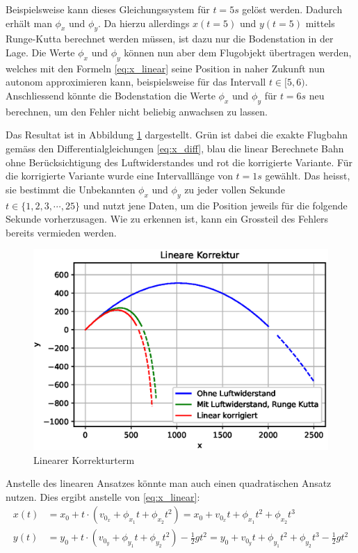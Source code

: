Beispielsweise kann dieses Gleichungssystem für $t = 5s$ gelöst werden. Dadurch erhält man $\phi_x$ und $\phi_y$. Da hierzu allerdings $x(t=5)$ und $y(t=5)$ mittels Runge-Kutta berechnet werden müssen, ist dazu nur die Bodenstation in der Lage. 
Die Werte $\phi_x$ und $\phi_y$ können nun aber dem Flugobjekt übertragen werden, welches mit den Formeln \eqref{eq:x_linear} seine Position in naher Zukunft nun autonom approximieren kann, beispielsweise für das Intervall $t \in [5,6)$. Anschliessend könnte die Bodenstation die Werte $\phi_x$ und $\phi_y$ für $t=6s$ neu berechnen, um den Fehler nicht beliebig anwachsen zu lassen.

Das Resultat ist in Abbildung \ref{naive_linear_term} dargestellt. Grün ist dabei die exakte Flugbahn gemäss den Differentialgleichungen \eqref{eq:x_diff}, blau die linear Berechnete Bahn ohne Berücksichtigung des Luftwiderstandes und rot die korrigierte Variante. Für die korrigierte Variante wurde eine Intervalllänge von $t=1s$ gewählt. Das heisst, sie bestimmt die Unbekannten $\phi_x$ und $\phi_y$ zu jeder vollen Sekunde $t \in \{1, 2, 3, \cdots, 25\}$ und nutzt jene Daten, um die Position jeweils für die folgende Sekunde vorherzusagen. 
Wie zu erkennen ist, kann ein Grossteil des Fehlers bereits vermieden werden.
\begin{figure}
    \centering
    \includegraphics[scale=0.7]{papers/perturbation/bilder/perturbation_fig1.eps}
    \caption{Linearer Korrekturterm}
	\label{naive_linear_term}
\end{figure}


Anstelle des linearen Ansatzes könnte man auch einen quadratischen Ansatz nutzen. Dies ergibt anstelle von \eqref{eq:x_linear}:
\begin{equation}
\begin{aligned}
x(t) &= x_0 + t \cdot (v_{0_x} + \phi_{x_1}t + \phi_{x_2}t^2) = x_0 + v_{0_x}t + \phi_{x_1}t^2 + \phi_{x_2}t^3\\
y(t) &= y_0 + t \cdot (v_{0_y} + \phi_{y_1}t + \phi_{y_2}t^2) - \frac{1}{2}gt^2 = y_0 + v_{0_y}t + \phi_{y_1}t^2 + \phi_{y_2}t^3 - \frac{1}{2}gt^2
\end{aligned}
\end{equation}


